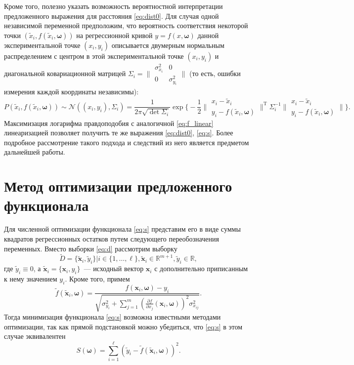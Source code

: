 \documentclass[tikz,10pt,a4paper]{article}
\newcommand{\bomega}{\boldsymbol{\omega}}
\begin{document}
Кроме того, полезно указать возможность вероятностной интерпретации предложенного
выражения для расстояния \eqref{eq:dist0}.
Для случая одной независимой переменной предположим, что
вероятность соответствия некоторой точки $(\tilde{x}_i, f(\tilde{x}_i, \bomega))$
на регрессионной кривой $y = f(x, \bomega)$
данной экспериментальной точке $(x_i, y_i)$
описывается двумерным нормальным распределением
с центром в этой экспериментальной точке $(x_i, y_i)$
и диагональной ковариационной матрицей
$\Sigma_i = \big\| \begin{smallmatrix} \sigma_{x_i}^2 & 0 \\ 0 & \sigma_{y_i}^2 \end{smallmatrix} \big\|$
(то есть, ошибки измерения каждой координаты независимы):
\[
  P(\tilde{x}_i, f(\tilde{x}_i, \bomega)) \sim \mathcal{N}((x_i, y_i), \Sigma_i)
	= \frac{1}{2 \pi \sqrt{\det \Sigma_i}}
			\exp \Big\{ -\frac{1}{2}
						\Big\|\begin{matrix} x_i - \tilde{x}_i \\ y_i - f(\tilde{x}_i, \bomega) \end{matrix}\Big\|^\mathrm{T}
						\Sigma_i^{-1}
						\Big\|\begin{matrix} x_i - \tilde{x}_i \\ y_i - f(\tilde{x}_i, \bomega) \end{matrix}\Big\|
				 \Big\}.
\]
Максимизация логарифма правдоподобия
с аналогичной \eqref{eq:f_linear} линеаризацией
позволяет получить те же выражения \eqref{eq:dist0}, \eqref{eq:s}.
Более подробное рассмотрение такого подхода
и следствий из него является предметом дальнейшей работы.

\section{Метод оптимизации предложенного функционала}

Для численной оптимизации функционала \eqref{eq:s} представим его в виде
суммы квадратов регрессионных остатков путем следующего переобозначения переменных.
Вместо выборки \eqref{eq:d}
рассмотрим выборку
\[
  \tilde{D} = \{ \tilde{\mathbf{x}}_i, \tilde{y}_i \} | i \in \{ 1, \dots, \ell \}, \tilde{\mathbf{x}}_i \in \mathbb{R}^{m + 1}, \tilde{y}_i \in \mathbb{R},
\]
где $\tilde{y}_i \equiv 0$, а
$\tilde{\mathbf{x}}_i = \{ \mathbf{x}_i, y_i \}$~--- исходный вектор $\mathbf{x}_i$
с дополнительно приписанным к нему значением $y_i$. Кроме того, примем
\[
  \tilde{f}(\tilde{\mathbf{x}}_i, \bomega) = \frac{f(\mathbf{x}_i, \bomega) - y_i}{\sqrt{\sigma_{y_i}^2 + \sum_{j = 1}^m (\frac{\partial f}{\partial x_j}(\mathbf{x}_i, \bomega))^2 \sigma^2_{x_{ij}}}}.
\]
Тогда минимизация функционала \eqref{eq:s} возможна известными методами оптимизации, так
как прямой подстановкой можно убедиться, что \eqref{eq:s} в этом случае эквивалентен
\[
  S(\bomega) = \sum_{i = 1}^\ell (\tilde{y}_i - \tilde{f}(\tilde{\mathbf{x}}_i, \bomega))^2.
\]
\end{document}
